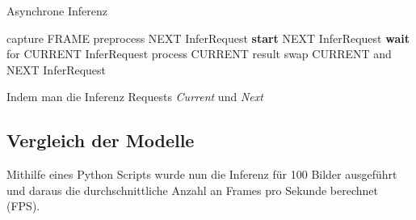 \vspace{1cm}
\begin{minipage}{0.1\textwidth}
  \hfill
\end{minipage}
\begin{minipage}{0.5\textwidth}
  \begin{algorithm}[H]
    \caption{Asynchrone Inferenz}
    \begin{algorithmic}
    \WHILE{\TRUE}
        \STATE capture FRAME
        \STATE preprocess NEXT InferRequest
        \STATE \textbf{start} NEXT InferRequest
          \STATE \textbf{wait} for CURRENT InferRequest
          \STATE process CURRENT result
          \STATE swap CURRENT and NEXT InferRequest
    \ENDWHILE
    \end{algorithmic}
  \end{algorithm}
\end{minipage}
\begin{minipage}{0.4\textwidth}
  \centering
  \vspace{1cm}
  \def\svgwidth{0.5\textwidth}
  
\end{minipage}

\vspace{1cm}

\begin{figure}[H]
  \centering
  \def\svgwidth{0.8\textwidth}
  
  \caption{}
  \label{}
\end{figure}

Indem man die Inferenz Requests \textit{Current} und \textit{Next}






%     




\subsection{Vergleich der Modelle}

Mithilfe eines Python Scripts wurde nun die Inferenz für 100 Bilder 
ausgeführt und daraus die durchschnittliche Anzahl an Frames pro 
Sekunde berechnet (FPS).

